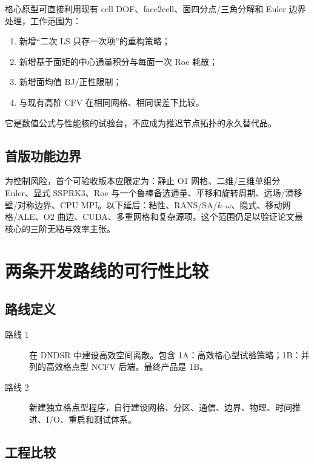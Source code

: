 \documentclass[UTF8,a4paper,11pt,openany]{ctexrep}
\numberwithin{equation}{chapter}
\begin{document}
格心原型可直接利用现有 cell DOF、face2cell、面四分点/三角分解和 Euler 边界处理，工作范围为：

\begin{enumerate}
  \item 新增“二次 LS 只存一次项”的重构策略；
  \item 新增基于面矩的中心通量积分与每面一次 Roe 耗散；
  \item 新增面均值 BJ/正性限制；
  \item 与现有高阶 CFV 在相同网格、相同误差下比较。
\end{enumerate}

它是数值公式与性能核的试验台，不应成为推迟节点拓扑的永久替代品。

\section{首版功能边界}

为控制风险，首个可验收版本应限定为：静止 O1 网格、二维/三维单组分 Euler、显式 SSPRK3、Roe 与一个鲁棒备选通量、平移和旋转周期、远场/滑移壁/对称边界、CPU MPI。以下延后：粘性、RANS/SA/$k$--$\omega$、隐式、移动网格/ALE、O2 曲边、CUDA、多重网格和复杂源项。这个范围仍足以验证论文最核心的三阶无粘与效率主张。

\chapter{两条开发路线的可行性比较}

\section{路线定义}

\begin{description}
  \item[路线 1] 在 DNDSR 中建设高效空间离散。包含 1A：高效格心型试验策略；1B：并列的高效格点型 NCFV 后端。最终产品是 1B。
  \item[路线 2] 新建独立格点型程序，自行建设网格、分区、通信、边界、物理、时间推进、I/O、重启和测试体系。
\end{description}

\section{工程比较}
\end{document}
